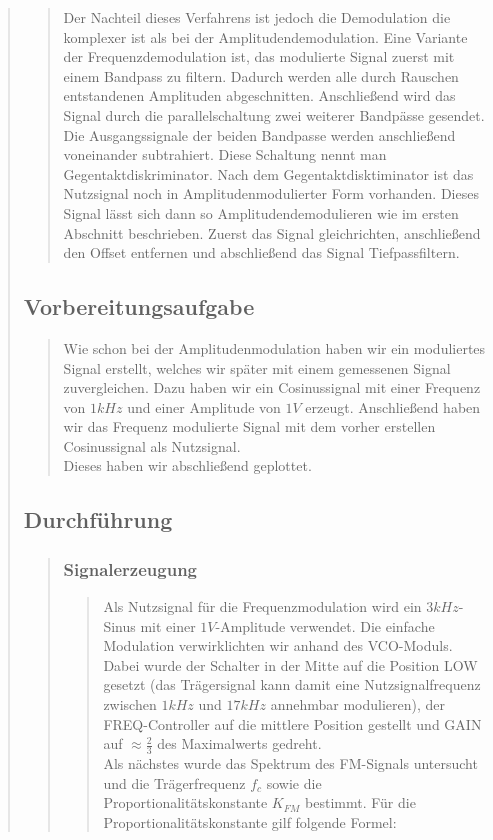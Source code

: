\begin{quote}
\begin{quote}
        Der Nachteil dieses Verfahrens ist jedoch die Demodulation die komplexer ist als bei der Amplitudendemodulation.
        Eine Variante der Frequenzdemodulation ist, das modulierte Signal zuerst mit einem Bandpass zu filtern. Dadurch
        werden alle durch Rauschen entstandenen Amplituden abgeschnitten. Anschließend wird das Signal durch die
        parallelschaltung zwei weiterer Bandpässe gesendet. Die Ausgangssignale der beiden Bandpasse werden anschließend
        voneinander subtrahiert. Diese Schaltung nennt man Gegentaktdiskriminator. Nach dem Gegentaktdisktiminator ist
        das Nutzsignal noch in Amplitudenmodulierter Form vorhanden. Dieses Signal lässt sich dann so
        Amplitudendemodulieren wie im ersten Abschnitt beschrieben. Zuerst das Signal gleichrichten, anschließend den
        Offset entfernen und abschließend das Signal Tiefpassfiltern.
    
    \end{quote}
    
    \subsection{Vorbereitungsaufgabe}
    \begin{quote}
        Wie schon bei der Amplitudenmodulation  haben wir ein moduliertes Signal erstellt, welches wir später mit einem
        gemessenen Signal zuvergleichen. Dazu haben wir ein Cosinussignal mit einer Frequenz von
        $1kHz$ und einer Amplitude von $1V$ erzeugt. Anschließend haben wir das Frequenz modulierte Signal mit dem
        vorher erstellen Cosinussignal als Nutzsignal.\\
        Dieses haben wir abschließend geplottet.
    \end{quote}
    
    \subsection{Durchführung}
    \begin{quote}
        \subsubsection{Signalerzeugung}
        \begin{quote}
        Als Nutzsignal für die Frequenzmodulation wird ein $3 kHz$-Sinus mit
        einer $1 V$-Amplitude verwendet. Die einfache Modulation verwirklichten
        wir anhand des VCO-Moduls. Dabei wurde der Schalter in der Mitte auf
        die Position LOW gesetzt (das Trägersignal kann damit eine
        Nutzsignalfrequenz zwischen $1 kHz$ und $17 kHz$ annehmbar modulieren),
        der FREQ-Controller auf die mittlere Position gestellt und GAIN auf
        $\approx \frac{2}{3}$ des Maximalwerts gedreht.\\
        Als nächstes wurde das Spektrum des FM-Signals untersucht und die
        Trägerfrequenz $f_c$ sowie die Proportionalitätskonstante $K_{FM}$
        bestimmt. Für die Proportionalitätskonstante gilf folgende Formel:
        

\end{quote}
\end{quote}
\end{quote}
